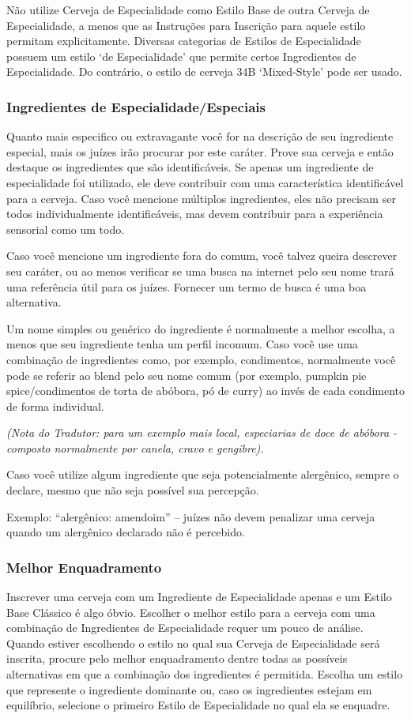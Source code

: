 Não utilize Cerveja de Especialidade como Estilo Base de outra Cerveja de Especialidade, a menos que as Instruções para Inscrição para aquele estilo permitam explicitamente. Diversas categorias de Estilos de Especialidade possuem um estilo ‘de Especialidade’ que permite certos Ingredientes de Especialidade. Do contrário, o estilo de cerveja 34B ‘Mixed-Style’ pode ser usado.

\subsubsection*{Ingredientes de Especialidade/Especiais}
Quanto mais especifico ou extravagante você for na descrição de seu ingrediente especial, mais os juízes irão procurar por este caráter. Prove sua cerveja e então destaque os ingredientes que são identificáveis. Se apenas um ingrediente de especialidade foi utilizado, ele deve contribuir com uma característica identificável para a cerveja. Caso você mencione múltiplos ingredientes, eles não precisam ser todos individualmente identificáveis, mas devem contribuir para a experiência sensorial como um todo.

Caso você mencione um ingrediente fora do comum, você talvez queira descrever seu caráter, ou ao menos verificar se uma busca na internet pelo seu nome trará uma referência útil para os juízes. Fornecer um termo de busca é uma boa alternativa.

Um nome simples ou genérico do ingrediente é normalmente a melhor escolha, a menos que seu ingrediente tenha um perfil incomum. Caso você use uma combinação de ingredientes como, por exemplo, condimentos, normalmente você pode se referir ao blend pelo seu nome comum (por exemplo, pumpkin pie spice/condimentos de torta de abóbora, pó de curry) ao invés de cada condimento de forma individual.

\textit{(Nota do Tradutor: para um exemplo mais local, especiarias de doce de abóbora - composto normalmente por canela, cravo e gengibre).}

Caso você utilize algum ingrediente que seja potencialmente alergênico, sempre o declare, mesmo que não seja possível sua percepção.

Exemplo: “alergênico: amendoim” – juízes não devem penalizar uma cerveja quando um alergênico declarado não é percebido.

\subsubsection*{Melhor Enquadramento}
Inscrever uma cerveja com um Ingrediente de Especialidade apenas e um Estilo Base Clássico é algo óbvio. Escolher o melhor estilo para a cerveja com uma combinação de Ingredientes de Especialidade requer um pouco de análise. Quando estiver escolhendo o estilo no qual sua Cerveja de Especialidade será inscrita, procure pelo melhor enquadramento dentre todas as possíveis alternativas em que a combinação dos ingredientes é permitida. Escolha um estilo que represente o ingrediente dominante ou, caso os ingredientes estejam em equilíbrio, selecione o primeiro Estilo de Especialidade no qual ela se enquadre.

